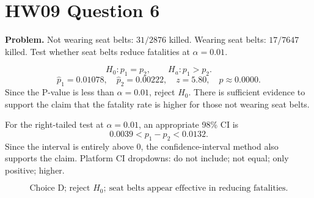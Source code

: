 \documentclass[11pt]{article}
\begin{document}
\section*{HW09 Question 6}

\textbf{Problem.} Not wearing seat belts: \(31/2876\) killed. Wearing seat belts: \(17/7647\) killed. Test whether seat belts reduce fatalities at \(\alpha=0.01\).

\[
H_0:p_1=p_2,\qquad H_a:p_1>p_2.
\]
\[
\hat p_1=0.01078,\quad \hat p_2=0.00222,\quad z=5.80,\quad p\approx0.0000.
\]
Since the P-value is less than \(\alpha=0.01\), reject \(H_0\). There is sufficient evidence to support the claim that the fatality rate is higher for those not wearing seat belts.

For the right-tailed test at \(\alpha=0.01\), an appropriate 98\% CI is
\[
0.0039 < p_1-p_2 < 0.0132.
\]
Since the interval is entirely above 0, the confidence-interval method also supports the claim.
Platform CI dropdowns: do not include; not equal; only positive; higher.

\[
\boxed{\text{Choice D; reject }H_0;\ \text{seat belts appear effective in reducing fatalities.}}
\]
\end{document}
